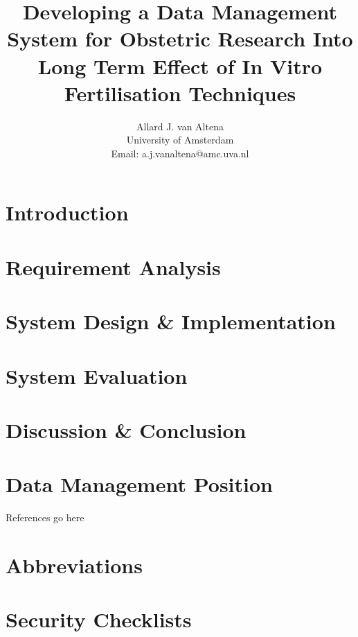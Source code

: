 \documentclass[a4paper]{report}
\title{Developing a Data Management System for Obstetric Research Into Long Term Effect of In Vitro Fertilisation Techniques}
\author{
	Allard J. van Altena\\
	University of Amsterdam\\
	Email: a.j.vanaltena@amc.uva.nl
}
\begin{document}
	\maketitle
	
	\tableofcontents
	
	\chapter{Introduction}
	\label{introduction}
	
	
	
	\chapter{Requirement Analysis}
	\label{requirements}
	
	
	
	
	
	\chapter{System Design \& Implementation}
	\label{system-functionality}
	
	
	
	
	
	\chapter{System Evaluation}
	\label{evaluation}
	
	
	
	\chapter{Discussion \& Conclusion}
	\label{discussion}
	
	
	
	\chapter{Data Management Position}
	\label{position}
	
	
	
	\clearpage
	
	References go here
	
	\appendix
	\chapter{Abbreviations}
	\label{abbreviations}
	
	\chapter{Security Checklists}
	\label{security-appendix}
\end{document}
